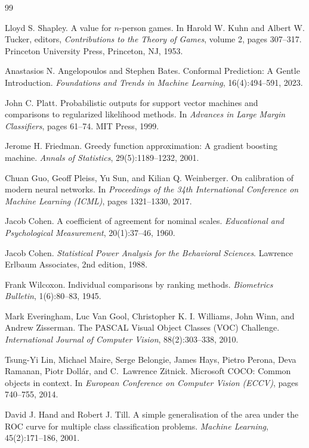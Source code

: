 \documentclass[11pt,a4paper]{article}
\begin{document}
\clearpage

\begin{thebibliography}{99}

Lloyd S. Shapley.
\newblock A value for $n$-person games.
\newblock In Harold W. Kuhn and Albert W. Tucker, editors, \emph{Contributions to the Theory of Games}, volume 2, pages 307--317. Princeton University Press, Princeton, NJ, 1953.

Anastasios N. Angelopoulos and Stephen Bates.
\newblock Conformal Prediction: A Gentle Introduction.
\newblock \emph{Foundations and Trends in Machine Learning}, 16(4):494--591, 2023.

John C. Platt.
\newblock Probabilistic outputs for support vector machines and comparisons to regularized likelihood methods.
\newblock In \emph{Advances in Large Margin Classifiers}, pages 61--74. MIT Press, 1999.

Jerome H. Friedman.
\newblock Greedy function approximation: A gradient boosting machine.
\newblock \emph{Annals of Statistics}, 29(5):1189--1232, 2001.

Chuan Guo, Geoff Pleiss, Yu Sun, and Kilian Q. Weinberger.
\newblock On calibration of modern neural networks.
\newblock In \emph{Proceedings of the 34th International Conference on Machine Learning (ICML)}, pages 1321--1330, 2017.

Jacob Cohen.
\newblock A coefficient of agreement for nominal scales.
\newblock \emph{Educational and Psychological Measurement}, 20(1):37--46, 1960.

Jacob Cohen.
\newblock \emph{Statistical Power Analysis for the Behavioral Sciences}.
\newblock Lawrence Erlbaum Associates, 2nd edition, 1988.

Frank Wilcoxon.
\newblock Individual comparisons by ranking methods.
\newblock \emph{Biometrics Bulletin}, 1(6):80--83, 1945.

Mark Everingham, Luc Van Gool, Christopher K. I. Williams, John Winn, and Andrew Zisserman.
\newblock The PASCAL Visual Object Classes (VOC) Challenge.
\newblock \emph{International Journal of Computer Vision}, 88(2):303--338, 2010.

Tsung-Yi Lin, Michael Maire, Serge Belongie, James Hays, Pietro Perona, Deva Ramanan, Piotr Doll\'ar, and C.\ Lawrence Zitnick.
\newblock Microsoft COCO: Common objects in context.
\newblock In \emph{European Conference on Computer Vision (ECCV)}, pages 740--755, 2014.

David J. Hand and Robert J. Till.
\newblock A simple generalisation of the area under the ROC curve for multiple class classification problems.
\newblock \emph{Machine Learning}, 45(2):171--186, 2001.


\end{thebibliography}
\end{document}
